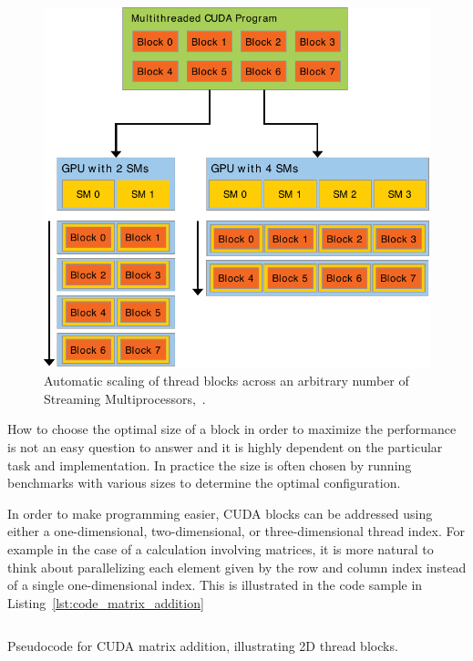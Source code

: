 \begin{figure}[!htbp]
  \centering
  \includegraphics[width=\textwidth]{img/automatic_scaling.pdf}
  \caption[Automatic scaling of blocks across an arbitrary number of Streaming Multiprocessors.]{Automatic scaling of thread blocks across an arbitrary number of Streaming Multiprocessors,~\cite{CudaProgrammingGuide}.}
  \label{fig:automatic_scaling}
\end{figure}

How to choose the optimal size of a block in order to maximize the performance is not an easy question to answer and it is highly dependent on the particular task and implementation. In practice the size is often chosen by running benchmarks with various sizes to determine the optimal configuration.

In order to make programming easier, CUDA blocks can be addressed using either a one-dimensional, two-dimensional, or three-dimensional thread index. For example in the case of a calculation involving matrices, it is more natural to think about parallelizing each element given by the row and column index instead of a single one-dimensional index. This is illustrated in the code sample in Listing~\ref{lst:code_matrix_addition}

\begin{listing}[!htbp]
  \centering
  \inputminted[mathescape,
    linenos,
    numbersep=5pt,
    fontsize=\footnotesize,
    frame=lines,
    framesep=2mm]{c}{lst/cuda_matrix_add.lst}
  \caption{Pseudocode for CUDA matrix addition, illustrating 2D thread blocks.}
  \label{lst:code_matrix_addition}
\end{listing}

